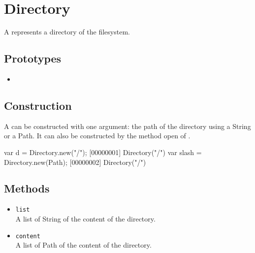 \section{Directory}

A  represents a directory of the filesystem.

\subsection{Prototypes}
\begin{itemize}
\item {}
\end{itemize}

\subsection{Construction}

A  can be constructed with one argument: the path of
the directory using a String or a Path. It can also be constructed by
the method open of .

\begin{urbiscript}
var d = Directory.new("/");
[00000001] Directory("/")
var slash = Directory.new(Path);
[00000002] Directory("/")
\end{urbiscript}

\subsection{Methods}
\begin{itemize}
\item \lstinline|list|\\
  A list of String of the content of the directory.

\item \lstinline|content|\\
  A list of Path of the content of the directory.

\end{itemize}
